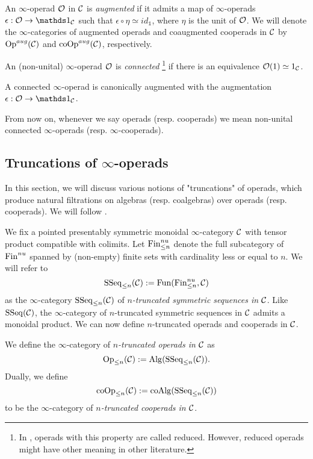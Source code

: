 \begin{definition}
	An $\infty$-operad ${\mathcal{O}}$ in ${\mathcal{C}}$ is \emph{augmented} if it admits a map of $\infty$-operads $\epsilon:\CO\rightarrow \triv_{\CC}$ such that $\epsilon\circ \eta\simeq id_{\mathds{1}}$, where $\eta$ is the unit of ${\mathcal{O}}$. We will denote the $\infty$-categories of augmented operads and coaugmented cooperads in ${\mathcal{C}}$ by $\operatorname{Op}^{aug}({\mathcal{C}})$ and $\operatorname{coOp}^{aug}({\mathcal{C}})$, respectively.

\end{definition}

\begin{definition}
	An (non-unital) $\infty$-operad ${\mathcal{O}}$ is \emph{connected} \footnote{In \cite{ChingBar}, operads with this property are called reduced. However, reduced operads might have other meaning in other literature.} if there is an equivalence ${\mathcal{O}}(1)\simeq 1_{{\mathcal{C}}}$. 
\end{definition}
\begin{remark}
A connected $\infty$-operad is canonically augmented with the augmentation $\epsilon:\CO\to \triv_{\CC}$.
\end{remark}  

\begin{remark}
From now on, whenever we say operads (resp. cooperads) we mean non-unital connected $\infty$-operads (resp. $\infty$-cooperads).
\end{remark}


\subsection{Truncations of $\infty$-operads}
In this section, we will discuss various notions of "truncations" of operads, which produce natural filtrations on algebras (resp. coalgebras) over operads (resp. cooperads).
We will follow \cite{Heuts_Koszul}.

We fix a pointed presentably symmetric monoidal $\infty$-category ${\mathcal{C}}$ with tensor product compatible with colimits.
Let $\operatorname{Fin}^{nu}_{\leq n}$ denote the full subcategory of $\operatorname{Fin}^{nu}$ spanned by (non-empty) finite sets with cardinality less or equal to $n$.
We will refer to
$$
\operatorname{SSeq}_{\leq n}({\mathcal{C}}):=\operatorname{Fun}(\operatorname{Fin}^{nu}_{\leq n}, {\mathcal{C}})
$$ 
as the $\infty$-category $\operatorname{SSeq}_{\leq n}({\mathcal{C}})$ of \emph{$n$-truncated symmetric sequences in ${\mathcal{C}}$}.
Like $\operatorname{SSeq}({\mathcal{C}})$, the $\infty$-category of $n$-truncated symmetric sequences in ${\mathcal{C}}$ admits a monoidal product.
We can now define $n$-truncated operads and cooperads in ${\mathcal{C}}$.
\begin{definition}
    We define the $\infty$-category of \emph{$n$-truncated operads in ${\mathcal{C}}$} as 
    $$
    \operatorname{Op}_{\leq n}({\mathcal{C}}) :=\operatorname{Alg}(\operatorname{SSeq}_{\leq n}({\mathcal{C}})).
    $$
    Dually, we define 
    $$
     \operatorname{coOp}_{\leq n}({\mathcal{C}}) := \operatorname{coAlg}(\operatorname{SSeq}_{\leq n}({\mathcal{C}})) 
    $$
    to be the $\infty$-category of \emph{$n$-truncated cooperads in ${\mathcal{C}}$}.
\end{definition}


